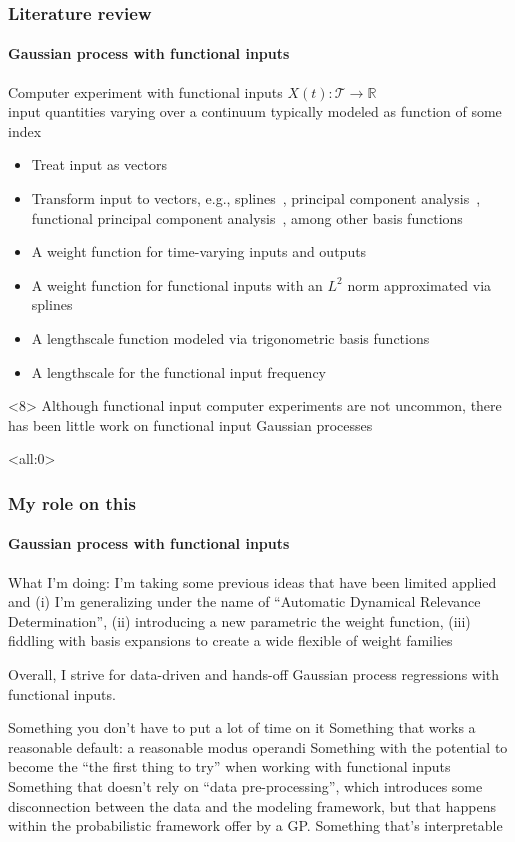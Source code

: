 \documentclass{snedecorbeamer}
\begin{document}
\begin{frame}
  \frametitle{Literature review}
  \framesubtitle{Gaussian process with functional inputs}

  Computer experiment with functional inputs $X(t):
  \mathcal{T}\to\mathbb{R}$ \\
  input quantities varying over a continuum typically modeled as function of
  some index

  \begin{itemize}[<+(1)->]
  \item Treat input as vectors~\citep{iooss2009}
  \item Transform input to vectors, e.g.,
    splines~\citep{betancourt2020,betancourt2020a}, principal component
    analysis~\citep{nanty2016}, functional principal component
    analysis~\citep{wang2017,wang2019}, among other basis
    functions~\citep{tan2019,li2021}
  \item A weight function for time-varying inputs and outputs~\citep{morris2012}
  \item A weight function for functional inputs with an $L^2$ norm approximated
    via splines \citep{muehlenstaedt2017}
  \item A lengthscale function modeled via trigonometric basis functions
    \citep{kuttubekova2019}
  \item A lengthscale for the functional input frequency \citep{chen2021}
  \end{itemize}

  \vfill{}
  \begin{exampleblock}{}<8>
    Although functional input computer experiments are not uncommon,
    there has been little work on functional input Gaussian processes
  \end{exampleblock}
\end{frame}

\begin{frame}<all:0>
  \frametitle{My role on this}
  \framesubtitle{Gaussian process with functional inputs}

  What I'm doing: I'm taking some previous ideas that have been limited applied
  and (i) I'm generalizing under the name of ``Automatic Dynamical Relevance
  Determination'', (ii) introducing a new parametric the weight function,
  (iii) fiddling with basis expansions to create a wide flexible of weight
  families

  Overall, I strive for data-driven and hands-off Gaussian process regressions
  with functional inputs.

  Something you don't have to put a lot of time on it
  Something that works a reasonable default: a reasonable modus operandi
  Something with the potential to become the ``the first thing to try'' when
  working with functional inputs
  Something that doesn't rely on ``data pre-processing'', which introduces some
disconnection between the data and the modeling framework, but that happens
within the probabilistic framework offer by a GP.
  Something that's interpretable
\end{frame}
\end{document}
